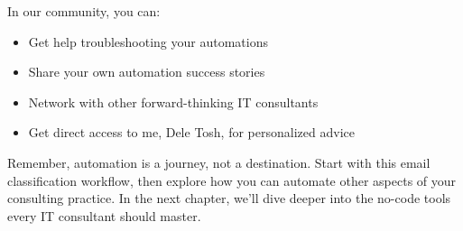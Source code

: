 In our community, you can:
\begin{itemize}
    \item Get help troubleshooting your automations
    \item Share your own automation success stories
    \item Network with other forward-thinking IT consultants
    \item Get direct access to me, Dele Tosh, for personalized advice
\end{itemize}

Remember, automation is a journey, not a destination. Start with this email classification workflow, then explore how you can automate other aspects of your consulting practice. In the next chapter, we'll dive deeper into the no-code tools every IT consultant should master.